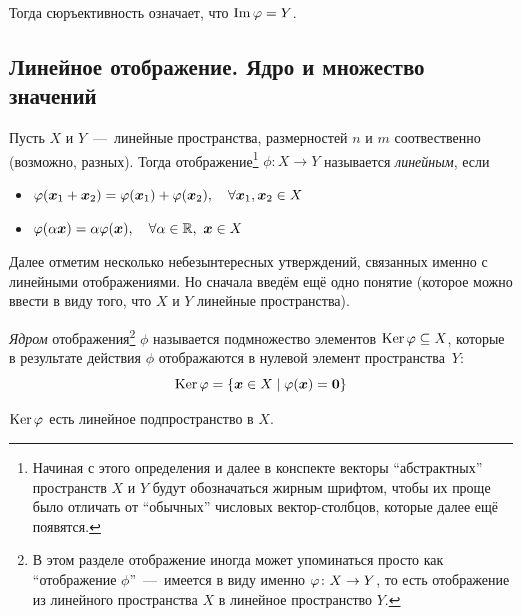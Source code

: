 \documentclass[a4paper,12pt]{article}
\DeclareMathOperator{\Imag}{Im}
\begin{document}
  Тогда сюръективность означает, что $\Imag \phi \hm= Y$.
  
  
  \subsection{Линейное отображение. Ядро и множество значений}
  
  
  \begin{definition}
    Пусть $X$ и $Y$~---~линейные пространства, размерностей $n$ и $m$ соотвественно (возможно, разных).
    Тогда отображение\footnote{Начиная с этого определения и далее в конспекте векторы ``абстрактных'' пространств $X$ и $Y$ будут обозначаться жирным шрифтом, чтобы их проще было отличать от ``обычных'' числовых вектор-столбцов, которые далее ещё появятся.} $\phi\colon X \to Y$ называется \emph{линейным}, если
    \begin{itemize}
      \item $\phi(\bds x_1 + \bds x_2) \hm= \phi(\bds x_1) \hm+ \phi(\bds x_2), \quad \forall \bds x_1, \bds x_2 \hm\in X$
      \item $\phi(\alpha \bds x) \hm= \alpha \phi(\bds x),\quad \forall \alpha \hm\in \RR,\ \bds x \hm\in X$
    \end{itemize}
  \end{definition}
  
  Далее отметим несколько небезынтересных утверждений, связанных именно с линейными отображениями.
  Но сначала введём ещё одно понятие (которое можно ввести в виду того, что $X$ и $Y$ линейные пространства).
  
  \begin{definition}
    \emph{Ядром} отображения\footnote{В этом разделе отображение иногда может упоминаться просто как ``отображение $\phi$''~---~имеется в виду именно $\phi\colon X \hm\to Y$, то есть отображение из линейного пространства $X$ в линейное пространство $Y$.} $\phi$ называется подмножество элементов $\Ker\phi \hm\subseteq X$, которые в результате действия $\phi$ отображаются в нулевой элемент пространства~$Y$:
    \[
      \operatorname{Ker} \varphi = \{\boldsymbol x \in X \mid \varphi(\boldsymbol x) = \boldsymbol 0\}
    \]
  \end{definition}
  
  \begin{proposition}
    $\operatorname{Ker} \varphi$ есть линейное подпространство в $X$.
  \end{proposition}
  
\end{document}
